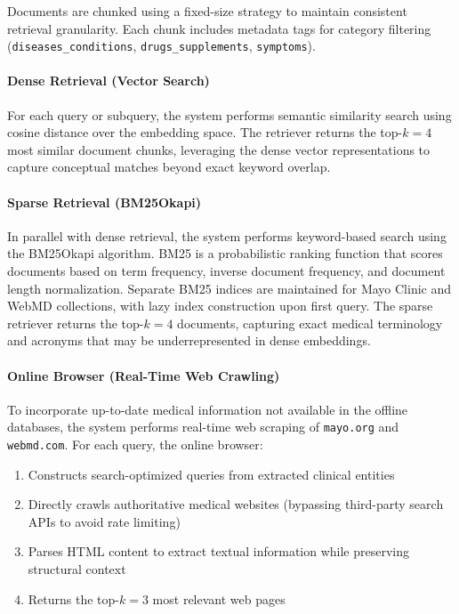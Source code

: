 \documentclass[11pt]{article}
\begin{document}
Documents are chunked using a fixed-size strategy to maintain consistent retrieval granularity. Each chunk includes metadata tags for category filtering (\texttt{diseases\_conditions}, \texttt{drugs\_supplements}, \texttt{symptoms}).

\paragraph{Dense Retrieval (Vector Search)}
For each query or subquery, the system performs semantic similarity search using cosine distance over the embedding space. The retriever returns the top-$k=4$ most similar document chunks, leveraging the dense vector representations to capture conceptual matches beyond exact keyword overlap.

\paragraph{Sparse Retrieval (BM25Okapi)}
In parallel with dense retrieval, the system performs keyword-based search using the BM25Okapi algorithm. BM25 is a probabilistic ranking function that scores documents based on term frequency, inverse document frequency, and document length normalization. Separate BM25 indices are maintained for Mayo Clinic and WebMD collections, with lazy index construction upon first query. The sparse retriever returns the top-$k=4$ documents, capturing exact medical terminology and acronyms that may be underrepresented in dense embeddings.

\paragraph{Online Browser (Real-Time Web Crawling)}
To incorporate up-to-date medical information not available in the offline databases, the system performs real-time web scraping of \texttt{mayo.org} and \texttt{webmd.com}. For each query, the online browser:
\begin{enumerate}
    \item Constructs search-optimized queries from extracted clinical entities
    \item Directly crawls authoritative medical websites (bypassing third-party search APIs to avoid rate limiting)
    \item Parses HTML content to extract textual information while preserving structural context
    \item Returns the top-$k=3$ most relevant web pages
\end{enumerate}
\end{document}
